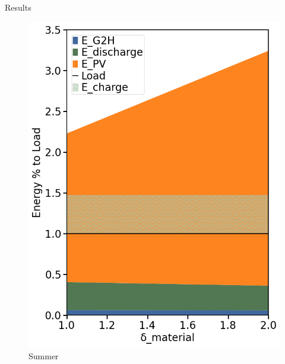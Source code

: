 \begin{frame}[c]{Results}
\begin{itemize}
\begin{figure}[htbp]
\begin{minipage}{0.24\linewidth}
                    \includegraphics[width=\linewidth]{Figures/summer.png}
                    \footnotesize
                    \caption{Summer}
                \end{minipage}\hfill
            \end{figure} 

    \end{itemize}
    
\end{frame}

